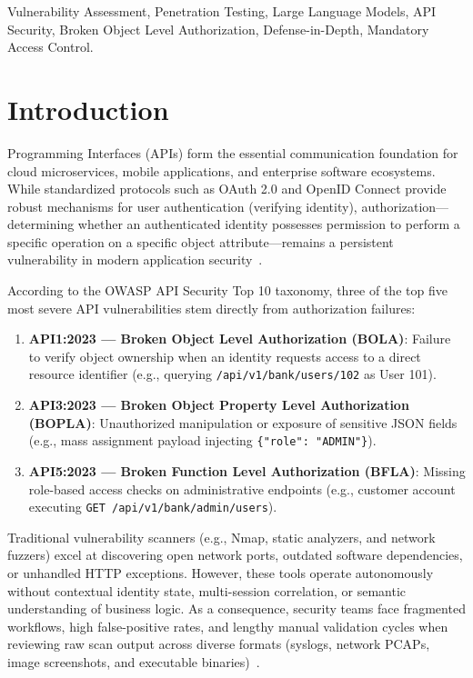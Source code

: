 \documentclass[journal]{IEEEtran}
\begin{document}
\begin{IEEEkeywords}
Vulnerability Assessment, Penetration Testing, Large Language Models, API Security, Broken Object Level Authorization, Defense-in-Depth, Mandatory Access Control.
\end{IEEEkeywords}

\section{Introduction}

 Programming Interfaces (APIs) form the essential communication foundation for cloud microservices, mobile applications, and enterprise software ecosystems. While standardized protocols such as OAuth 2.0 and OpenID Connect provide robust mechanisms for user authentication (verifying identity), authorization—determining whether an authenticated identity possesses permission to perform a specific operation on a specific object attribute—remains a persistent vulnerability in modern application security~\cite{owasp2023top10}.

According to the OWASP API Security Top 10 taxonomy, three of the top five most severe API vulnerabilities stem directly from authorization failures:
\begin{enumerate}
    \item \textbf{API1:2023 --- Broken Object Level Authorization (BOLA)}: Failure to verify object ownership when an identity requests access to a direct resource identifier (e.g., querying \texttt{/api/v1/bank/users/102} as User 101).
    \item \textbf{API3:2023 --- Broken Object Property Level Authorization (BOPLA)}: Unauthorized manipulation or exposure of sensitive JSON fields (e.g., mass assignment payload injecting \texttt{\{"role": "ADMIN"\}}).
    \item \textbf{API5:2023 --- Broken Function Level Authorization (BFLA)}: Missing role-based access checks on administrative endpoints (e.g., customer account executing \texttt{GET /api/v1/bank/admin/users}).
\end{enumerate}

Traditional vulnerability scanners (e.g., Nmap, static analyzers, and network fuzzers) excel at discovering open network ports, outdated software dependencies, or unhandled HTTP exceptions. However, these tools operate autonomously without contextual identity state, multi-session correlation, or semantic understanding of business logic. As a consequence, security teams face fragmented workflows, high false-positive rates, and lengthy manual validation cycles when reviewing raw scan output across diverse formats (syslogs, network PCAPs, image screenshots, and executable binaries)~\cite{deng2024pentestgpt,ferrag2024generative}.
\end{document}
